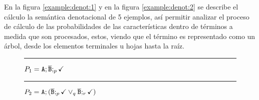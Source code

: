 En la figura \ref{example:denot:1} y en
la figura \ref{example:denot:2} se describe
el cálculo la semántica denotacional de 5 ejemplos,
así permitir analizar el proceso de cálculo de 
las probabilidades de las características dentro de
términos a medida que son procesados, estos,
viendo que el término es representado como un árbol,
desde los elementos terminales u hojas hasta la raíz. 




\begin{figure}[h]
        \hrule
        
        \vspace*{1em}
        
        \centering $P_{1} = \mathtt{A};\overline{\mathtt{B}};_{p}\checkmark$\review
        
        
        \vspace*{1em} \hrule\vspace*{1em}
        
        
        \centering 
        $P_{2} = \mathtt{A};(\overline{\mathtt{B}};_{p}\checkmark \mathbin{\lor}_{q} \overline{\mathtt{B}};_{r}\checkmark)$ \review
        

\end{figure}
